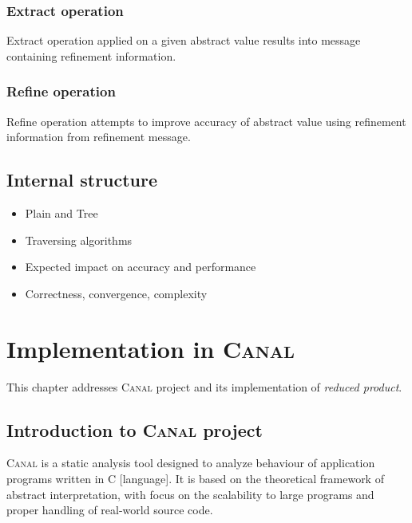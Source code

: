 \documentclass[12pt,oneside]{fithesis2}
\theoremstyle{definition}
\begin{document}
\subsection{Extract operation}

Extract operation applied on a given abstract value results into message containing refinement information.

\subsection{Refine operation}

Refine operation attempts to improve accuracy of abstract value using refinement information from refinement message.

\section{Internal structure}
\begin{itemize}
  \item Plain and Tree
  \item Traversing algorithms
  \item Expected impact on accuracy and performance
  \item Correctness, convergence, complexity
\end{itemize}


\chapter{Implementation in \textsc{Canal}}

This chapter addresses \textsc{Canal} project and its implementation of \textit{reduced product}.

\section{Introduction to \textsc{Canal} project}

\textsc{Canal} is a static analysis tool designed to analyze behaviour of
application programs written in C [language]. It is based on the theoretical
framework of abstract interpretation, with focus on the scalability to
large programs and proper handling of real-world source code. \cite{Canal}
\end{document}

